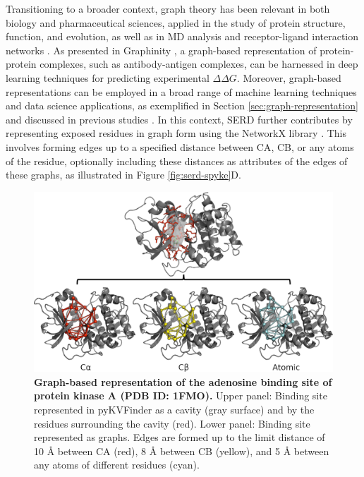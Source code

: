 \documentclass[Ingles]{phdthesis}
\begin{document}
Transitioning to a broader context, graph theory has been relevant in both biology and pharmaceutical sciences, applied in the study of protein structure, function, and evolution, as well as in \acs{MD} analysis and receptor-ligand interaction networks \cite{vishveshwara2002,mason2007,hummer2023}. As presented in Graphinity \cite{hummer2023}, a graph-based representation of protein-protein complexes, such as antibody-antigen complexes, can be harnessed in deep learning techniques for predicting experimental $\Delta \Delta G$. Moreover, graph-based representations can be employed in a broad range of machine learning techniques and data science applications, as exemplified in Section \ref{sec:graph-representation} and discussed in previous studies \cite{majeed2020,vishveshwara2002,mason2007}. In this context, \acs{SERD} further contributes by representing exposed residues in graph form using the NetworkX library \cite{networkx}. This involves forming edges up to a specified distance between \acs{CA}, \acs{CB}, or any atoms of the residue, optionally including these distances as attributes of the edges of these graphs, as illustrated in Figure \ref{fig:serd-spyke}D.

\begin{figure}[H]
  \centering
  \includegraphics[scale=0.75]{images/graph-representation-of-binding-sites.png}
  \caption[Graph-based representation of the adenosine binding site of protein kinase A.]{\textbf{Graph-based representation of the adenosine binding site of protein kinase A (PDB ID: 1FMO).} Upper panel: Binding site represented in pyKVFinder as a cavity (gray surface) and by the residues surrounding the cavity (red). Lower panel: Binding site represented as graphs. Edges are formed up to the limit distance of 10 Å between \acs{CA} (red), 8 Å between \acs{CB} (yellow), and 5 Å between any atoms of different residues (cyan).}
  \label{fig:serd-cavity}
\end{figure}
\end{document}
